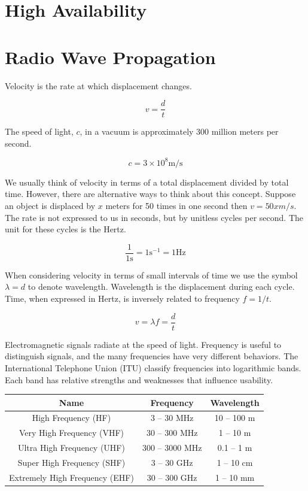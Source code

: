 \documentclass{book}
\begin{document}
\chapter{High Availability}

\chapter{Radio Wave Propagation}

Velocity is the rate at which displacement changes.

\begin{equation}
v = \frac{d}{t}
\end{equation}

The speed of light, $c$, in a vacuum is approximately 300 million meters per second.

\begin{equation}
c = 3 \times 10^8 \si{\meter}/\si{\second}
\end{equation}

We usually think of velocity in terms of a total displacement divided by total time. However, there are alternative ways to think about this concept. Suppose an object is displaced by $x$ meters for 50 times in one second then $v = 50x m/s$. The rate is not expressed to us in seconds, but by unitless cycles per second. The unit for these cycles is the Hertz.

\begin{equation}
\frac{1}{1 \si{\second}} = 1 \si{\second}^{-1} = 1 \si{\hertz}
\end{equation}

When considering velocity in terms of small intervals of time we use the symbol $\lambda = d$ to denote wavelength. Wavelength is the displacement during each cycle. Time, when expressed in Hertz, is inversely related to frequency $f = 1/t$.

\begin{equation}
v = \lambda f = \frac{d}{t}
\end{equation}

Electromagnetic signals radiate at the speed of light. Frequency is useful to distinguish signals, and the many frequencies have very different behaviors. The International Telephone Union (ITU) classify frequencies into logarithmic bands. Each band has relative strengths and weaknesses that influence usability. 

\begin{center}
\begin{tabular}{c | c | c}
Name & Frequency & Wavelength \\
\hline
High Frequency (HF) & 3 -- 30 \si{\MHz} & 10 -- 100 \si{\meter} \\
Very High Frequency (VHF) & 30 -- 300 \si{\MHz} & 1 -- 10 \si{\meter} \\
Ultra High Frequency (UHF) & 300 -- 3000 \si{\MHz} & 0.1 -- 1 \si{\meter} \\
Super High Frequency (SHF) & 3 -- 30 \si{\GHz} & 1 -- 10 \si{\cm} \\
Extremely High Frequency (EHF) & 30 -- 300 \si{\GHz} & 1 -- 10 \si{\mm}
\end{tabular}
\end{center}
\end{document}
